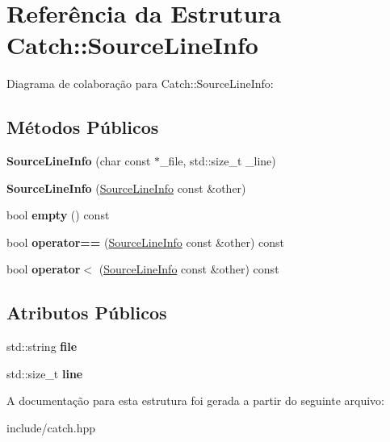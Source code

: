 \hypertarget{structCatch_1_1SourceLineInfo}{}\section{Referência da Estrutura Catch\+:\+:Source\+Line\+Info}
\label{structCatch_1_1SourceLineInfo}


Diagrama de colaboração para Catch\+:\+:Source\+Line\+Info\+:
\subsection*{Métodos Públicos}
\begin{DoxyCompactItemize}
\item 
{\bfseries Source\+Line\+Info} (char const $\ast$\+\_\+file, std\+::size\+\_\+t \+\_\+line)\hypertarget{structCatch_1_1SourceLineInfo_a6218cb890337d37f708ea94063958940}{}\label{structCatch_1_1SourceLineInfo_a6218cb890337d37f708ea94063958940}

\item 
{\bfseries Source\+Line\+Info} (\hyperlink{structCatch_1_1SourceLineInfo}{Source\+Line\+Info} const \&other)\hypertarget{structCatch_1_1SourceLineInfo_a1ec99cc0547ce5909133aaa8f14ed4b1}{}\label{structCatch_1_1SourceLineInfo_a1ec99cc0547ce5909133aaa8f14ed4b1}

\item 
bool {\bfseries empty} () const \hypertarget{structCatch_1_1SourceLineInfo_a9a25ffc0640d1a3dd0c9b7e5fcbba7b9}{}\label{structCatch_1_1SourceLineInfo_a9a25ffc0640d1a3dd0c9b7e5fcbba7b9}

\item 
bool {\bfseries operator==} (\hyperlink{structCatch_1_1SourceLineInfo}{Source\+Line\+Info} const \&other) const \hypertarget{structCatch_1_1SourceLineInfo_af0854821b1abfda52796ef0f1294b050}{}\label{structCatch_1_1SourceLineInfo_af0854821b1abfda52796ef0f1294b050}

\item 
bool {\bfseries operator$<$} (\hyperlink{structCatch_1_1SourceLineInfo}{Source\+Line\+Info} const \&other) const \hypertarget{structCatch_1_1SourceLineInfo_a581c02d683808232168bfc2e775c3554}{}\label{structCatch_1_1SourceLineInfo_a581c02d683808232168bfc2e775c3554}

\end{DoxyCompactItemize}
\subsection*{Atributos Públicos}
\begin{DoxyCompactItemize}
\item 
std\+::string {\bfseries file}\hypertarget{structCatch_1_1SourceLineInfo_adf3ccf0c2bd326eb3466318af82a94dd}{}\label{structCatch_1_1SourceLineInfo_adf3ccf0c2bd326eb3466318af82a94dd}

\item 
std\+::size\+\_\+t {\bfseries line}\hypertarget{structCatch_1_1SourceLineInfo_a841e5d696c7b9cde24e45e61dd979c77}{}\label{structCatch_1_1SourceLineInfo_a841e5d696c7b9cde24e45e61dd979c77}

\end{DoxyCompactItemize}


A documentação para esta estrutura foi gerada a partir do seguinte arquivo\+:\begin{DoxyCompactItemize}
\item 
include/catch.\+hpp\end{DoxyCompactItemize}
